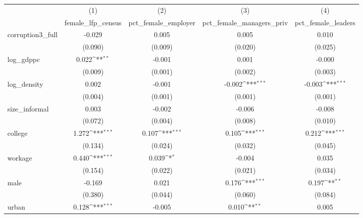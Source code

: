 {
\def\sym#1{\ifmmode^{#1}\else\(^{#1}\)\fi}
\begin{tabular}{l*{4}{c}}
\hline\hline
            &\multicolumn{1}{c}{(1)}&\multicolumn{1}{c}{(2)}&\multicolumn{1}{c}{(3)}&\multicolumn{1}{c}{(4)}\\
            &\multicolumn{1}{c}{female\_lfp\_census}&\multicolumn{1}{c}{pct\_female\_employer}&\multicolumn{1}{c}{pct\_female\_managers\_priv}&\multicolumn{1}{c}{pct\_female\_leaders}\\
\hline
corruption3\_full&      -0.029         &       0.005         &       0.005         &       0.010         \\
            &     (0.090)         &     (0.009)         &     (0.020)         &     (0.025)         \\
[1em]
log\_gdppc   &       0.022\sym{**} &      -0.001         &       0.001         &      -0.000         \\
            &     (0.009)         &     (0.001)         &     (0.002)         &     (0.003)         \\
[1em]
log\_density &       0.002         &      -0.001         &      -0.002\sym{***}&      -0.003\sym{***}\\
            &     (0.004)         &     (0.001)         &     (0.001)         &     (0.001)         \\
[1em]
size\_informal&       0.003         &      -0.002         &      -0.006         &      -0.008         \\
            &     (0.072)         &     (0.004)         &     (0.008)         &     (0.010)         \\
[1em]
college     &       1.272\sym{***}&       0.107\sym{***}&       0.105\sym{***}&       0.212\sym{***}\\
            &     (0.134)         &     (0.024)         &     (0.032)         &     (0.045)         \\
[1em]
workage     &       0.440\sym{***}&       0.039\sym{*}  &      -0.004         &       0.035         \\
            &     (0.154)         &     (0.022)         &     (0.021)         &     (0.034)         \\
[1em]
male        &      -0.169         &       0.021         &       0.176\sym{***}&       0.197\sym{**} \\
            &     (0.380)         &     (0.044)         &     (0.060)         &     (0.084)         \\
[1em]
urban       &       0.128\sym{***}&      -0.005         &       0.010\sym{**} &       0.005         \\

\end{tabular}}
